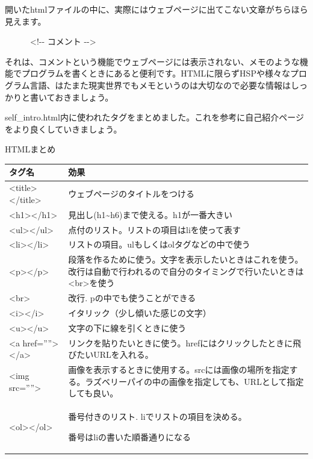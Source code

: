 \documentclass[a4paper,12pt,dvipdfmx]{jarticle}
\begin{document}
\bigskip

開いたhtmlファイルの中に、実際にはウェブページに出てこない文章がちらほら見えます。

\ \ \ \ \ \ {\textless}!-{}- コメント -{}-{\textgreater}

それは、コメントという機能でウェブページには表示されない、メモのような機能でプログラムを書くときにあると便利です。HTMLに限らずHSPや様々なプログラム言語、はたまた現実世界でもメモというのは大切なので必要な情報はしっかりと書いておきましょう。

self\_intro.html内に使われたタグをまとめました。これを参考に自己紹介ページをより良くしていきましょう。

\clearpage
HTMLまとめ\ \

\begin{center}
\tablefirsthead{}
\tablehead{}
\tabletail{}
\tablelasttail{}
\begin{supertabular}{|m{4.0cm}|m{12.0cm}|}
\hline
タグ名 &
効果\\\hline
{\textless}title{\textgreater}{\textless}/title{\textgreater} &
ウェブページのタイトルをつける\\\hline
{\textless}h1{\textgreater}{\textless}/h1{\textgreater} &
見出し(h1\~{}h6)まで使える。h1が一番大きい\\\hline
{\textless}ul{\textgreater}{\textless}/ul{\textgreater} &
点付のリスト。リストの項目はliを使って表す\\\hline
{\textless}li{\textgreater}{\textless}/li{\textgreater} &
リストの項目。ulもしくはolタグなどの中で使う\\\hline
{\textless}p{\textgreater}{\textless}/p{\textgreater} &
段落を作るために使う。文字を表示したいときはこれを使う。改行は自動で行われるので自分のタイミングで行いたいときは{\textless}br{\textgreater}を使う\\\hline
{\textless}br{\textgreater} &
改行. pの中でも使うことができる\\\hline
{\textless}i{\textgreater}{\textless}/i{\textgreater} &
イタリック（少し傾いた感じの文字）\\\hline
{\textless}u{\textgreater}{\textless}/u{\textgreater} &
文字の下に線を引くときに使う\\\hline
{\textless}a href=””{\textgreater}{\textless}/a{\textgreater} &
リンクを貼りたいときに使う。hrefにはクリックしたときに飛びたいURLを入れる。\\\hline
{\textless}img src=””{\textgreater} &
画像を表示するときに使用する。srcには画像の場所を指定する。ラズベリーパイの中の画像を指定しても、URLとして指定しても良い。\\\hline
{\textless}ol{\textgreater}{\textless}/ol{\textgreater} &
番号付きのリスト.
liでリストの項目を決める。

番号はliの書いた順番通りになる\\\hline
\end{supertabular}
\end{center}
\end{document}
